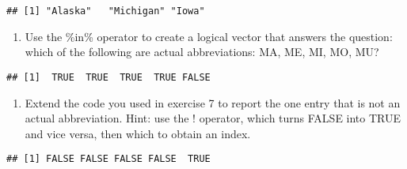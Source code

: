 \documentclass[
]{article}
\newenvironment{Shaded}{\begin{snugshade}}{\end{snugshade}}
\newcommand{\ConstantTok}[1]{\textcolor[rgb]{0.00,0.00,0.00}{#1}}
\newcommand{\FunctionTok}[1]{\textcolor[rgb]{0.00,0.00,0.00}{#1}}
\newcommand{\NormalTok}[1]{#1}
\newcommand{\SpecialCharTok}[1]{\textcolor[rgb]{0.00,0.00,0.00}{#1}}
\newcommand{\StringTok}[1]{\textcolor[rgb]{0.31,0.60,0.02}{#1}}
\providecommand{\tightlist}{%
  \setlength{\itemsep}{0pt}\setlength{\parskip}{0pt}}
\begin{document}
\begin{verbatim}
## [1] "Alaska"   "Michigan" "Iowa"
\end{verbatim}

\begin{enumerate}
\def\labelenumi{\arabic{enumi}.}
\setcounter{enumi}{6}
\tightlist
\item
  Use the \%in\% operator to create a logical vector that answers the
  question: which of the following are actual abbreviations: MA, ME, MI,
  MO, MU?
\end{enumerate}

\begin{Shaded}
\end{Shaded}

\begin{verbatim}
## [1]  TRUE  TRUE  TRUE  TRUE FALSE
\end{verbatim}

\begin{enumerate}
\def\labelenumi{\arabic{enumi}.}
\setcounter{enumi}{7}
\tightlist
\item
  Extend the code you used in exercise 7 to report the one entry that is
  not an actual abbreviation. Hint: use the ! operator, which turns
  FALSE into TRUE and vice versa, then which to obtain an index.
\end{enumerate}

\begin{Shaded}
\end{Shaded}

\begin{verbatim}
## [1] FALSE FALSE FALSE FALSE  TRUE
\end{verbatim}

\begin{Shaded}
\end{Shaded}
\end{document}
